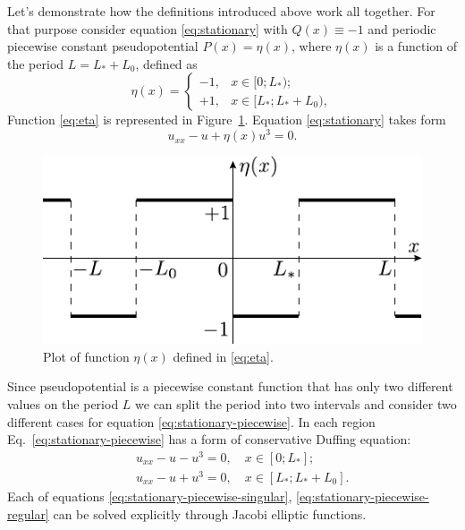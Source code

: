 Let's demonstrate how the definitions introduced above work all together.
For that purpose consider equation \eqref{eq:stationary} with $Q(x) \equiv -1$ and periodic piecewise constant pseudopotential $P(x) = \eta(x)$, where $\eta(x)$ is a function of the period $L = L_* + L_0$, defined as
\begin{equation}
	\eta(x) = \left\{
		\begin{array}{rl}
			-1, & x \in [0; L_*); \\
			+1, & x \in [L_*; L_* + L_0),
		\end{array}
	\right.
\label{eq:eta}
\end{equation}
Function \eqref{eq:eta} is represented in Figure~\ref{fig:piecewise-constant}.
Equation \eqref{eq:stationary} takes form
\begin{equation}
	u_{xx} - u + \eta(x) u^3 = 0. 
\label{eq:stationary-piecewise}
\end{equation}
\begin{figure}[h]
\centering
	\includegraphics[scale = 1.2]{pic/piecewise constant}
	\caption{Plot of function $\eta(x)$ defined in \eqref{eq:eta}.}
\label{fig:piecewise-constant}
\end{figure}
Since pseudopotential is a piecewise constant function that has only two different values on the period $L$ we can split the period into two intervals and consider two different cases for equation \eqref{eq:stationary-piecewise}.
In each region Eq.~\eqref{eq:stationary-piecewise} has a form of conservative Duffing equation:
\begin{eqnarray}
	&& u_{xx} - u - u^3 = 0, \quad x \in [0; L_*];\label{eq:stationary-piecewise-singular} \\
	&& u_{xx} - u + u^3 = 0, \quad x \in [L_*; L_* + L_0] \label{eq:stationary-piecewise-regular}.
\end{eqnarray}
Each of equations \eqref{eq:stationary-piecewise-singular}, \eqref{eq:stationary-piecewise-regular} can be solved explicitly  through Jacobi elliptic functions.
